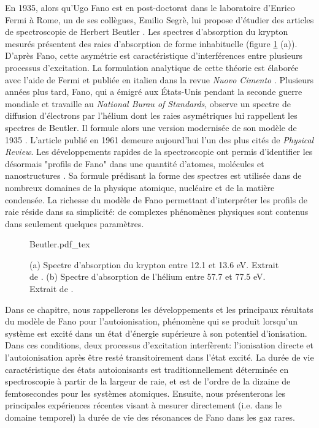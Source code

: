 En 1935, alors qu'Ugo Fano est en post-doctorat dans le laboratoire d'Enrico Fermi à Rome, un de ses collègues, Emilio Segrè, lui propose d'étudier des articles de spectroscopie de Herbert Beutler . Les spectres d'absorption du krypton mesurés présentent des raies d'absorption de forme inhabituelle (figure \ref{fig:Beutler} (a)). D'après Fano, cette asymétrie est caractéristique d'interférences entre plusieurs processus d'excitation. La formulation analytique de cette théorie est élaborée avec l'aide de Fermi et publiée en italien dans la revue \textit{Nuovo Cimento} . Plusieurs années plus tard, Fano, qui a émigré aux \'{E}tats-Unis pendant la seconde guerre mondiale et travaille au \textit{National Burau of Standards}, observe un spectre de diffusion d'électrons par l'hélium dont les raies asymétriques lui rappellent les spectres de Beutler. Il formule alors une version modernisée de son modèle de 1935 . L'article publié en 1961 demeure aujourd'hui l'un des plus cités de \textit{Physical Review}. Les développements rapides de la spectroscopie ont permis d'identifier les désormais "profils de Fano" dans une quantité d'atomes, molécules et nanostructures . Sa formule prédisant la forme des spectres est utilisée dans de nombreux domaines de la physique atomique, nucléaire et de la matière condensée. La richesse du modèle de Fano permettant d'interpréter les profils de raie réside dans sa simplicité: de complexes phénomènes physiques sont contenus dans seulement quelques paramètres.

\begin{figure}
\centering
\def\svgwidth{\textwidth}
{Beutler.pdf_tex}
\caption{(a) Spectre d'absorption du krypton entre 12.1 et 13.6 eV. Extrait de . (b) Spectre d'absorption de l'hélium entre 57.7 et 77.5 eV. Extrait de .}
\label{fig:Beutler}
\end{figure}

Dans ce chapitre, nous rappellerons les développements et les principaux résultats du modèle de Fano pour l'autoionisation, phénomène qui se produit lorsqu'un système est excité dans un état d'énergie supérieure à son potentiel d'ionisation. Dans ces conditions, deux processus d'excitation interfèrent: l'ionisation directe et l'autoionisation après être resté transitoirement dans l'état excité. La durée de vie caractéristique des états autoionisants est traditionnellement déterminée en spectroscopie à partir de la largeur de raie, et est de l'ordre de la dizaine de femtosecondes pour les systèmes atomiques. Ensuite, nous présenterons les principales expériences récentes visant à mesurer directement (i.e. dans le domaine temporel) la durée de vie des résonances de Fano dans les gaz rares.

